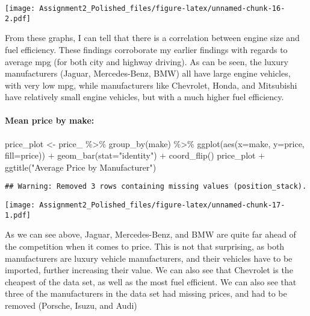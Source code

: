 \documentclass[
]{article}
\newenvironment{Shaded}{\begin{snugshade}}{\end{snugshade}}
\newcommand{\AttributeTok}[1]{\textcolor[rgb]{0.77,0.63,0.00}{#1}}
\newcommand{\FunctionTok}[1]{\textcolor[rgb]{0.00,0.00,0.00}{#1}}
\newcommand{\NormalTok}[1]{#1}
\newcommand{\OtherTok}[1]{\textcolor[rgb]{0.56,0.35,0.01}{#1}}
\newcommand{\SpecialCharTok}[1]{\textcolor[rgb]{0.00,0.00,0.00}{#1}}
\newcommand{\StringTok}[1]{\textcolor[rgb]{0.31,0.60,0.02}{#1}}
\begin{document}
\texttt{[image: Assignment2\_Polished\_files/figure-latex/unnamed-chunk-16-2.pdf]}

From these graphs, I can tell that there is a correlation between engine
size and fuel efficiency. These findings corroborate my earlier findings
with regards to average mpg (for both city and highway driving). As can
be seen, the luxury manufacturers (Jaguar, Mercedes-Benz, BMW) all have
large engine vehicles, with very low mpg, while manufacturers like
Chevrolet, Honda, and Mitsubishi have relatively small engine vehicles,
but with a much higher fuel efficiency.

\hypertarget{mean-price-by-make}{%
\paragraph{Mean price by make:}\label{mean-price-by-make}}

\begin{Shaded}
\begin{Highlighting}[]
\NormalTok{price\_plot }\OtherTok{\textless{}{-}}\NormalTok{ price\_ }\SpecialCharTok{\%\textgreater{}\%} \FunctionTok{group\_by}\NormalTok{(make) }\SpecialCharTok{\%\textgreater{}\%} \FunctionTok{ggplot}\NormalTok{(}\FunctionTok{aes}\NormalTok{(}\AttributeTok{x=}\NormalTok{make, }\AttributeTok{y=}\NormalTok{price, }\AttributeTok{fill=}\NormalTok{price)) }\SpecialCharTok{+} \FunctionTok{geom\_bar}\NormalTok{(}\AttributeTok{stat=}\StringTok{"identity"}\NormalTok{) }\SpecialCharTok{+} \FunctionTok{coord\_flip}\NormalTok{()}
\NormalTok{price\_plot }\SpecialCharTok{+} \FunctionTok{ggtitle}\NormalTok{(}\StringTok{"Average Price by Manufacturer"}\NormalTok{)}
\end{Highlighting}
\end{Shaded}

\begin{verbatim}
## Warning: Removed 3 rows containing missing values (position_stack).
\end{verbatim}

\texttt{[image: Assignment2\_Polished\_files/figure-latex/unnamed-chunk-17-1.pdf]}

As we can see above, Jaguar, Mercedes-Benz, and BMW are quite far ahead
of the competition when it comes to price. This is not that surprising,
as both manufacturers are luxury vehicle manufacturers, and their
vehicles have to be imported, further increasing their value. We can
also see that Chevrolet is the cheapest of the data set, as well as the
most fuel efficient. We can also see that three of the manufacturers in
the data set had missing prices, and had to be removed (Porsche, Isuzu,
and Audi)
\end{document}
